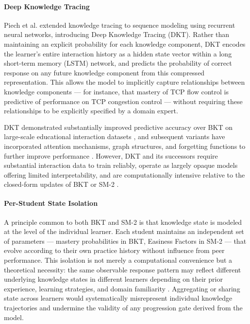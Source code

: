 \paragraph{Deep Knowledge Tracing}
Piech et al. \cite{piech2015dkt} extended knowledge tracing to sequence modeling using recurrent neural networks, introducing Deep Knowledge Tracing (DKT). Rather than maintaining an explicit probability for each knowledge component, DKT encodes the learner's entire interaction history as a hidden state vector within a long short-term memory (LSTM) network, and predicts the probability of correct response on any future knowledge component from this compressed representation. This allows the model to implicitly capture relationships between knowledge components — for instance, that mastery of TCP flow control is predictive of performance on TCP congestion control — without requiring these relationships to be explicitly specified by a domain expert.

DKT demonstrated substantially improved predictive accuracy over BKT on large-scale educational interaction datasets \cite{piech2015dkt}, and subsequent variants have incorporated attention mechanisms, graph structures, and forgetting functions to further improve performance \cite{pandey2019}. However, DKT and its successors require substantial interaction data to train reliably, operate as largely opaque models offering limited interpretability, and are computationally intensive relative to the closed-form updates of BKT or SM-2 \cite{khajah2016}.

\paragraph{Per-Student State Isolation}
A principle common to both BKT and SM-2 is that knowledge state is modeled at the level of the individual learner. Each student maintains an independent set of parameters — mastery probabilities in BKT, Easiness Factors in SM-2 — that evolve according to their own practice history without influence from peer performance. This isolation is not merely a computational convenience but a theoretical necessity: the same observable response pattern may reflect different underlying knowledge states in different learners depending on their prior experience, learning strategies, and domain familiarity \cite{corbett1994, vanlehn2006}. Aggregating or sharing state across learners would systematically misrepresent individual knowledge trajectories and undermine the validity of any progression gate derived from the model.

